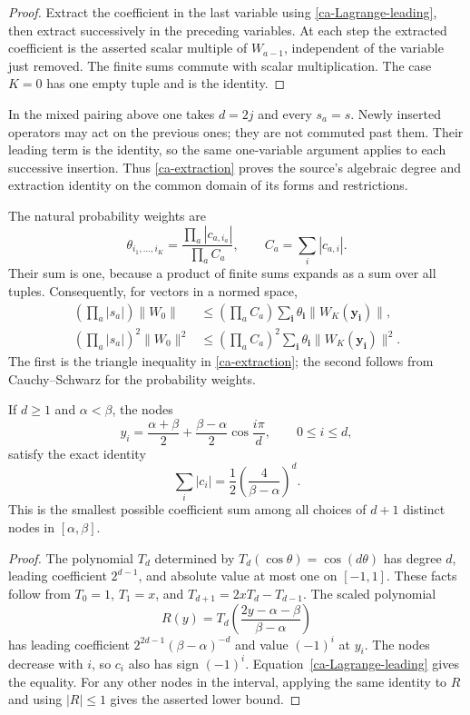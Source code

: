 \begin{proof}
Extract the coefficient in the last variable using
\eqref{ca-Lagrange-leading}, then extract successively in
the preceding variables.  At each step the extracted
coefficient is the asserted scalar multiple of $W_{a-1}$,
independent of the variable just removed.
The finite sums commute with scalar multiplication.
The case $K=0$ has one empty tuple and is the identity.
\end{proof}

In the mixed pairing above one takes $d=2j$ and every
$s_a=s$.  Newly inserted operators may act on the previous
ones; they are not commuted past them.
Their leading term is the identity, so the same one-variable
argument applies to each successive insertion.
Thus \eqref{ca-extraction} proves the source's algebraic
degree and extraction identity on the common domain of its
forms and restrictions.

The natural probability weights are
\[
 \theta_{i_1,\ldots,i_K}
   =\frac{\prod_a|c_{a,i_a}|}{\prod_a C_a},
 \qquad C_a=\sum_i|c_{a,i}|.
\]
Their sum is one, because a product of finite sums expands
as a sum over all tuples.  Consequently, for vectors in a
normed space,
\begin{align}
 \left(\prod_a|s_a|\right)\|W_0\|
   &\leq\left(\prod_aC_a\right)
         \sum_{\boldsymbol i}\theta_{\boldsymbol i}
                    \|W_K(\boldsymbol y_{\boldsymbol i})\|,
                    \label{ca-extraction-norm}\\
 \left(\prod_a|s_a|\right)^2\|W_0\|^2
   &\leq\left(\prod_aC_a\right)^2
         \sum_{\boldsymbol i}\theta_{\boldsymbol i}
                    \|W_K(\boldsymbol y_{\boldsymbol i})\|^2.
                    \label{ca-extraction-square}
\end{align}
The first is the triangle inequality in
\eqref{ca-extraction}; the second follows from
Cauchy--Schwarz for the probability weights.

\begin{lemma}\label{ca-Chebyshev}
If $d\geq1$ and $\alpha<\beta$, the nodes
\[
 y_i=\frac{\alpha+\beta}{2}
       +\frac{\beta-\alpha}{2}\cos\frac{i\pi}{d},
       \qquad 0\leq i\leq d,
\]
satisfy the exact identity
\[
 \sum_i|c_i|=\frac12\left(\frac4{\beta-\alpha}\right)^d.
\]
This is the smallest possible coefficient sum among all
choices of $d+1$ distinct nodes in $[\alpha,\beta]$.
\end{lemma}

\begin{proof}
The polynomial $T_d$ determined by
$T_d(\cos\theta)=\cos(d\theta)$ has degree $d$, leading
coefficient $2^{d-1}$, and absolute value at most one on
$[-1,1]$.  These facts follow from
$T_0=1$, $T_1=x$, and $T_{d+1}=2xT_d-T_{d-1}$.
The scaled polynomial
\[
 R(y)=T_d\left(\frac{2y-\alpha-\beta}{\beta-\alpha}\right)
\]
has leading coefficient
$2^{2d-1}(\beta-\alpha)^{-d}$ and value $(-1)^i$ at $y_i$.
The nodes decrease with $i$, so $c_i$ also has sign $(-1)^i$.
Equation~\eqref{ca-Lagrange-leading} gives the equality.
For any other nodes in the interval, applying the same
identity to $R$ and using $|R|\leq1$ gives the asserted
lower bound.
\end{proof}

